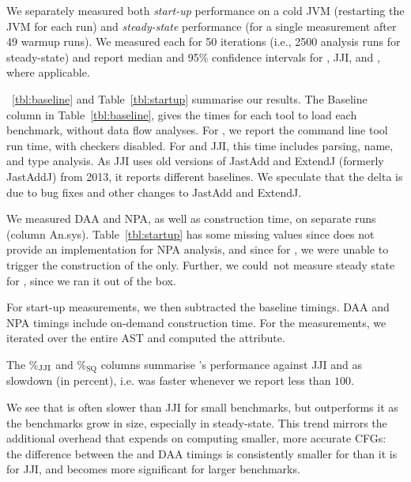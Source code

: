 We separately measured both \emph{start-up} performance on a cold JVM (restarting the JVM for each run)
and \emph{steady-state} performance (for a single measurement after 49 warmup runs).
We measured each for 50 iterations (i.e., 2500 analysis runs for steady-state) and report median and 95\% confidence intervals
for {\intraj}, JJI, and , where applicable.

~\ref{tbl:baseline} and Table~\ref{tbl:startup} summarise our results.
The Baseline column in Table~\ref{tbl:baseline}, gives the times for each tool to load each benchmark, without data flow analyses.
For , we report the command line tool run time, with checkers disabled.
For {\intraj} and JJI, this time includes parsing, name, and type analysis.
As JJI uses old versions of JastAdd and ExtendJ (formerly JastAddJ) from 2013, it reports different baselines.
We speculate that the delta is due to bug fixes and other changes to JastAdd and ExtendJ.

We measured DAA and NPA, as well as {\CFG} construction time, on separate runs (column An.sys).
Table~\ref{tbl:startup} has some missing values since  does not provide an implementation for NPA analysis, and since for , we were unable to trigger the construction of the \CFG{} only.
Further, we could~not measure steady state for , since we ran it out of the box.

For start-up measurements, we then subtracted the baseline timings.
DAA and NPA timings include on-demand {\CFG} construction time.
For the {\CFG} measurements, we iterated over the entire AST and computed the  attribute.

The \%$_{\text{\textsc{JJI}}}$ and \%$_{\text{SQ}}$ columns summarise {\intraj}'s performance against JJI and 
as slowdown (in percent), i.e.\@ {\intraj} was faster whenever we report less than $100$.

We see that {\intraj} is often slower than JJI for small benchmarks, but outperforms it as the benchmarks grow in size, especially in steady-state.
This trend mirrors the additional overhead that {\intraj} expends on computing smaller, more accurate CFGs:
the difference between the {\CFG} and DAA timings is consistently smaller for {\intraj} than it is for {JJI}, and becomes more significant for larger benchmarks.

